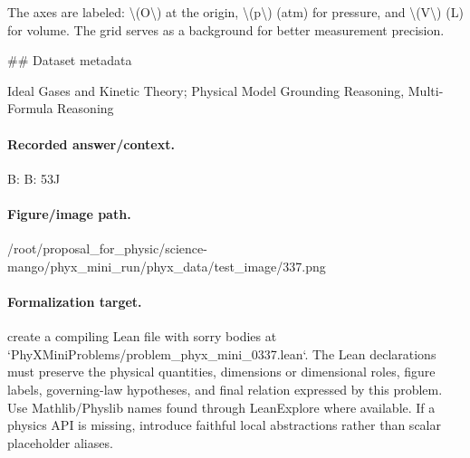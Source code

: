 The axes are labeled: \textbackslash{}(O\textbackslash{}) at the origin, \textbackslash{}(p\textbackslash{}) (atm) for pressure, and \textbackslash{}(V\textbackslash{}) (L) for volume. The grid serves as a background for better measurement precision.

\#\# Dataset metadata

Ideal Gases and Kinetic Theory; Physical Model Grounding Reasoning, Multi-Formula Reasoning

\paragraph{Recorded answer/context.}
B: B: 53J

\paragraph{Figure/image path.}
/root/proposal\_for\_physic/science-mango/phyx\_mini\_run/phyx\_data/test\_image/337.png

\paragraph{Formalization target.}
create a compiling Lean file with sorry bodies at `PhyXMiniProblems/problem\_phyx\_mini\_0337.lean`. The Lean declarations must preserve the physical quantities, dimensions or dimensional roles, figure labels, governing-law hypotheses, and final relation expressed by this problem.
Use Mathlib/Physlib names found through LeanExplore where available. If a physics API is missing, introduce faithful local abstractions rather than scalar placeholder aliases.

